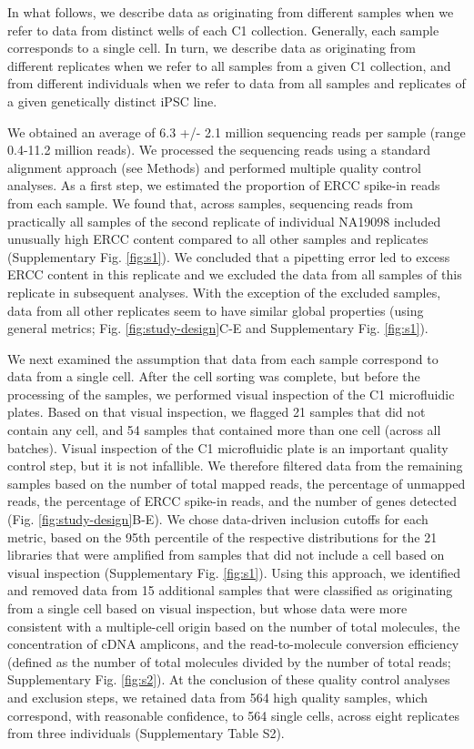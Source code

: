 In what follows, we describe data as originating from different samples
when we refer to data from distinct wells of each C1 collection.
Generally, each sample corresponds to a single cell. In turn, we
describe data as originating from different replicates when we refer to
all samples from a given C1 collection, and from different individuals
when we refer to data from all samples and replicates of a given
genetically distinct iPSC line.

We obtained an average of 6.3 +/- 2.1 million sequencing reads per
sample (range 0.4-11.2 million reads). We processed the sequencing reads
using a standard alignment approach (see Methods) and performed multiple
quality control analyses. As a first step, we estimated the proportion
of ERCC spike-in reads from each sample. We found that, across samples,
sequencing reads from practically all samples of the second replicate of
individual NA19098 included unusually high ERCC content compared to all
other samples and replicates (Supplementary Fig. \ref{fig:s1}). We concluded that
a pipetting error led to excess ERCC content in this replicate and we
excluded the data from all samples of this replicate in subsequent
analyses. With the exception of the excluded samples, data from all
other replicates seem to have similar global properties (using general
metrics; Fig. \ref{fig:study-design}C-E and Supplementary Fig. \ref{fig:s1}).

We next examined the assumption that data from each sample correspond to
data from a single cell. After the cell sorting was complete, but before
the processing of the samples, we performed visual inspection of the C1
microfluidic plates. Based on that visual inspection, we flagged 21
samples that did not contain any cell, and 54 samples that contained
more than one cell (across all batches). Visual inspection of the C1
microfluidic plate is an important quality control step, but it is not
infallible. We therefore filtered data from the remaining samples based
on the number of total mapped reads, the percentage of unmapped reads,
the percentage of ERCC spike-in reads, and the number of genes detected
(Fig. \ref{fig:study-design}B-E). We chose data-driven inclusion cutoffs for each metric,
based on the 95th percentile of the respective distributions for the 21
libraries that were amplified from samples that did not include a cell
based on visual inspection (Supplementary Fig. \ref{fig:s1}). Using this approach,
we identified and removed data from 15 additional samples that were
classified as originating from a single cell based on visual inspection,
but whose data were more consistent with a multiple-cell origin based on
the number of total molecules, the concentration of cDNA amplicons, and
the read-to-molecule conversion efficiency (defined as the number of
total molecules divided by the number of total reads; Supplementary Fig.
\ref{fig:s2}). At the conclusion of these quality control analyses and exclusion
steps, we retained data from 564 high quality samples, which correspond,
with reasonable confidence, to 564 single cells, across eight replicates
from three individuals (Supplementary Table S2).

